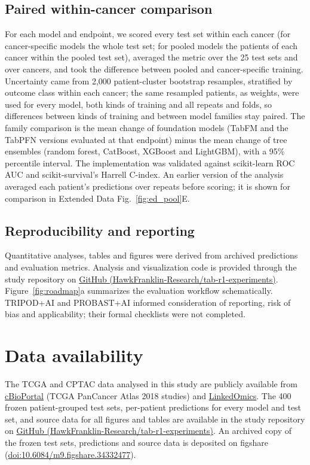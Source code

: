 \documentclass[11pt, a4paper, onecolumn, confidential, copyright]{hawkfranklin}
\begin{document}
\subsection*{Paired within-cancer comparison}
For each model and endpoint, we scored every test set within each cancer (for cancer-specific models the whole test set; for pooled models the patients of each cancer within the pooled test set), averaged the metric over the 25 test sets and over cancers, and took the difference between pooled and cancer-specific training. Uncertainty came from 2,000 patient-cluster bootstrap resamples, stratified by outcome class within each cancer; the same resampled patients, as weights, were used for every model, both kinds of training and all repeats and folds, so differences between kinds of training and between model families stay paired. The family comparison is the mean change of foundation models (TabFM and the TabPFN versions evaluated at that endpoint) minus the mean change of tree ensembles (random forest, CatBoost, XGBoost and LightGBM), with a 95\% percentile interval. The implementation was validated against scikit-learn ROC AUC and scikit-survival's Harrell C-index. An earlier version of the analysis averaged each patient's predictions over repeats before scoring; it is shown for comparison in Extended Data Fig.~\ref{fig:ed_pool}E.

\subsection*{Reproducibility and reporting}
Quantitative analyses, tables and figures were derived from archived predictions and evaluation metrics. Analysis and visualization code is provided through the study repository on \href{https://github.com/HawkFranklin-Research/tab-r1-experiments}{GitHub (HawkFranklin-Research/tab-r1-experiments)}. Figure~\ref{fig:roadmap}a summarizes the evaluation workflow schematically. TRIPOD+AI and PROBAST+AI informed consideration of reporting, risk of bias and applicability; their formal checklists were not completed.\citep{tripodai2024,probastai2024}

\section*{Data availability}
The TCGA and CPTAC data analysed in this study are publicly available from \href{https://www.cbioportal.org}{cBioPortal} (TCGA PanCancer Atlas 2018 studies) and \href{https://www.linkedomics.org}{LinkedOmics}. The 400 frozen patient-grouped test sets, per-patient predictions for every model and test set, and source data for all figures and tables are available in the study repository on \href{https://github.com/HawkFranklin-Research/tab-r1-experiments}{GitHub (HawkFranklin-Research/tab-r1-experiments)}. An archived copy of the frozen test sets, predictions and source data is deposited on figshare (\href{https://doi.org/10.6084/m9.figshare.34332477}{doi:10.6084/m9.figshare.34332477}).
\end{document}

